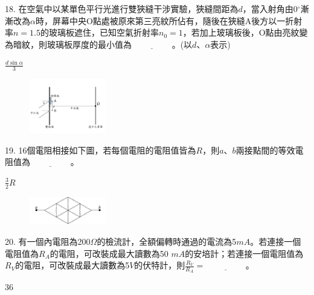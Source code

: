 \documentclass[cn,10pt,math=newtx,chinesefont=founder,device=ig]{elegantbook}
\begin{document}
\begin{example}
   18. 在空氣中以某單色平行光進行雙狹縫干涉實驗，狹縫間距為$d$，當入射角由0$^\circ$漸漸改為$\alpha$時，屏幕中央O點處被原來第三亮紋所佔有，隨後在狹縫A後方以一折射率$n=1.5$的玻璃板遮住，已知空氣折射率$n_0=1$，若加上玻璃板後，O點由亮紋變為暗紋，則玻璃板厚度的最小值為$\underline{\hspace{2cm}}$。(以$d、\alpha$表示)\\
    \rightline{[桃園高中教甄109]}
\end{example}
\begin{solution}
    $\frac{d \sin{\alpha}}{3}$
\end{solution}
\begin{figure}[htbp]
    \flushright
    \includegraphics[width=0.3\textwidth]{image/109桃園18.png}
  \end{figure}
\newpage


\begin{example}
   19. 16個電阻相接如下圖，若每個電阻的電阻值皆為$R$，則$a、b$兩接點間的等效電阻值為$\underline{\hspace{2cm}}$。\\
    \rightline{[桃園高中教甄109]}
\end{example}
\begin{solution}
    $\frac{3}{2} R$
\end{solution}
\begin{figure}[htbp]
    \flushright
    \includegraphics[width=0.3\textwidth]{image/109桃園19.png}
  \end{figure}
\newpage

\begin{example}
   20. 有一個內電阻為200$\Omega$的檢流計，全額偏轉時通過的電流為5$mA$。若連接一個電阻值為$R_A$的電阻，可改裝成最大讀數為50 $mA$的安培計；若連接一個電阻值為$R_V$的電阻，可改裝成最大讀數為5$V$的伏特計，則$\frac{R_V}{R_A}=\underline{\hspace{2cm}}$。\\
    \rightline{[桃園高中教甄109]}
\end{example}
\begin{solution}
    $36$
\end{solution}
\end{document}
